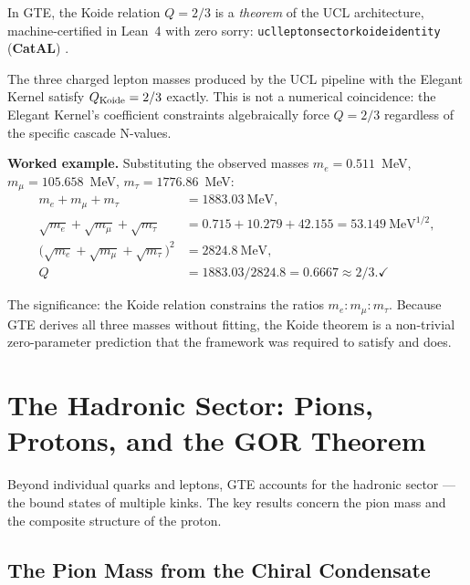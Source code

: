 \documentclass[11pt,a4paper]{article}
\newcommand{\lean}[1]{%
  \penalty-100
  \begingroup\def\_{\textunderscore\allowbreak}\texttt{#1}\endgroup}
\newcommand{\CatAL}{\textbf{CatAL}}
\begin{document}
In GTE, the Koide relation $Q = 2/3$ is a \emph{theorem} of the UCL architecture,
machine-certified in Lean~4 with zero sorry:
\lean{ucl\_lepton\_sector\_koide\_identity} (\CatAL)
\cite{SpivackGTECompleteFramework}.

\begin{tcolorbox}[colback=boxgreen,colframe=green!50!black,
  title={Koide Relation: GTE Theorem (\CatAL)}]
The three charged lepton masses produced by the UCL pipeline with the Elegant
Kernel satisfy $Q_{\rm Koide} = 2/3$ exactly.  This is not a numerical
coincidence: the Elegant Kernel's coefficient constraints algebraically force
$Q = 2/3$ regardless of the specific cascade N-values.
\end{tcolorbox}

\textbf{Worked example.}  Substituting the observed masses $m_e = 0.511$~MeV,
$m_\mu = 105.658$~MeV, $m_\tau = 1776.86$~MeV:
\begin{align*}
  m_e + m_\mu + m_\tau &= 1883.03~\text{MeV},\\
  \sqrt{m_e} + \sqrt{m_\mu} + \sqrt{m_\tau} &= 0.715 + 10.279 + 42.155
  = 53.149~\text{MeV}^{1/2},\\
  \bigl(\sqrt{m_e}+\sqrt{m_\mu}+\sqrt{m_\tau}\bigr)^2 &= 2824.8~\text{MeV},\\
  Q &= 1883.03 / 2824.8 = 0.6667 \approx 2/3. \checkmark
\end{align*}

The significance: the Koide relation constrains the ratios $m_e : m_\mu : m_\tau$.
Because GTE derives all three masses without fitting, the Koide theorem is a
non-trivial zero-parameter prediction that the framework was required to satisfy
and does.

\section{The Hadronic Sector: Pions, Protons, and the GOR Theorem}
\label{sec:hadrons}

Beyond individual quarks and leptons, GTE accounts for the hadronic sector —
the bound states of multiple kinks.  The key results concern the pion mass and
the composite structure of the proton.

\subsection{The Pion Mass from the Chiral Condensate}
\end{document}
